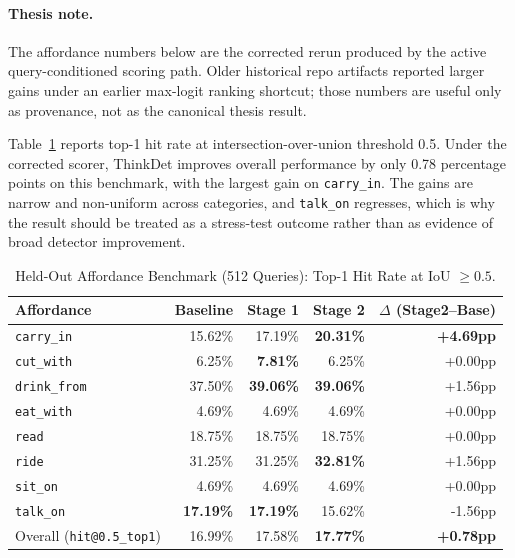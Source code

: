 \documentclass{uai2026} %
\begin{document}
\paragraph{Thesis note.}
The affordance numbers below are the corrected rerun produced by the active
query-conditioned scoring path. Older historical repo artifacts reported
larger gains under an earlier max-logit ranking shortcut; those numbers are
useful only as provenance, not as the canonical thesis result.

Table~\ref{tab:affordance-main} reports top-1 hit rate at intersection-over-union
threshold 0.5. Under the corrected scorer, ThinkDet improves overall
performance by only 0.78 percentage points on this benchmark, with the largest
gain on \texttt{carry\_in}. The gains are narrow and non-uniform across
categories, and \texttt{talk\_on} regresses, which is why the result should be
treated as a stress-test outcome rather than as evidence of broad detector
improvement.

\begin{table}[t]
\centering
\caption{Held-Out Affordance Benchmark (512 Queries): Top-1 Hit Rate at IoU \(\geq 0.5\).}
\label{tab:affordance-main}
\begin{tabular}{lrrrr}
\toprule
Affordance & Baseline & Stage 1 & Stage 2 & \(\Delta\) (Stage2--Base) \\
\midrule
\texttt{carry\_in}   & 15.62\% & 17.19\% & \textbf{20.31\%} & \textbf{+4.69pp} \\
\texttt{cut\_with}   &  6.25\% & \textbf{7.81\%} &  6.25\%  & +0.00pp \\
\texttt{drink\_from} & 37.50\% & \textbf{39.06\%} & \textbf{39.06\%} & +1.56pp \\
\texttt{eat\_with}   &  4.69\% &  4.69\% &  4.69\%         & +0.00pp \\
\texttt{read}        & 18.75\% & 18.75\% & 18.75\%         & +0.00pp \\
\texttt{ride}        & 31.25\% & 31.25\% & \textbf{32.81\%} & +1.56pp \\
\texttt{sit\_on}     &  4.69\% &  4.69\% &  4.69\%         & +0.00pp \\
\texttt{talk\_on}    & \textbf{17.19\%} & \textbf{17.19\%} & 15.62\% & -1.56pp \\
\midrule
Overall (\texttt{hit@0.5\_top1}) & 16.99\% & 17.58\% & \textbf{17.77\%} & \textbf{+0.78pp} \\
\bottomrule
\end{tabular}
\end{table}
\end{document}
